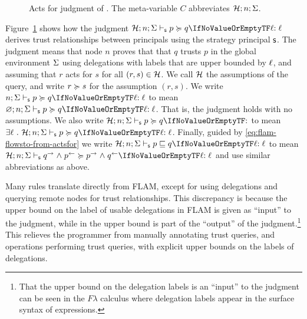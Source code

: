 \begin{figure}
    \caption{Acts for judgment of \lang. The meta-variable $C$ abbreviates $\mathcal{H}; n; \Sigma$.}
    \label{fig:act-for-judgment}
\end{figure}

Figure~\ref{fig:act-for-judgment} shows how the judgment $\actsforquery{\Assumps; n; \env}[\stratelem]{p}{q}{\level}$ derives trust relationships between principals using the strategy principal $\stratelem$. The judgment means that node $n$ proves that that $q$ trusts $p$ in the global environment $\Sigma$ using delegations with labels that are upper bounded by $\ell$, and assuming that $r$ acts for $s$ for all $(r, s) \in \mathcal{H}$. We call $\mathcal{H}$ the assumptions of the query, and write $r \succcurlyeq s$ for the assumption $(r, s)$. We write $\actsforquery{n; \env}[\stratelem]{p}{q}{\level}$ to mean $\actsforquery{\varnothing; n; \env}[\stratelem]{p}{q}{\level}$. That is, the judgment holds with no assumptions. We also write $\actsforquery{\Assumps; n; \env}[\stratelem]{p}{q}{}$ to mean $\exists \level~.~\actsforquery{\Assumps; n; \env}[\stratelem]{p}{q}{\level}$. Finally, guided by \eqref{eq:flam-flowsto-from-actsfor} we write $\flowstoquery{\Assumps; n; \env}[\stratelem]{p}{q}{\level}$ to mean $\actsforquery{\Assumps; n; \env}[\stratelem]{\conf{q} \conj \integ{p}}{\conf{p} \conj \integ{q}}{\level}$ and use similar abbreviations as above.

Many rules translate directly from FLAM, except for using delegations and querying remote nodes for trust relationships. This discrepancy is because the upper bound on the label of usable delegations in FLAM is given as ``input'' to the judgment, while in \lang{} the upper bound is part of the ``output'' of the judgment.\footnote{That the upper bound on the delegation labels is an ``input'' to the judgment can be seen in the $F\lambda$ calculus \cite{flamtr} where delegation labels appear in the surface syntax of expressions.} This relieves the programmer from manually annotating trust queries, and operations performing trust queries, with explicit upper bounds on the labels of delegations.

